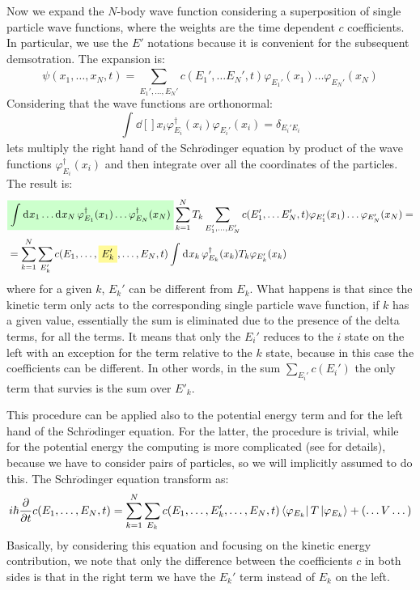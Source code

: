 \documentclass[../main/main.tex]{subfiles}
\begin{document}
Now we expand the \( N \)-body wave function considering a superposition of single particle wave functions, where the weights are the time dependent \( c \) coefficients. In particular, we use the \( E' \) notations because it is convenient for the subsequent demsotration.
The expansion is:
\begin{equation*}
  \psi (x_1, \dots, x_N, t) = \sum_{E_1', \dots, E_N'}^{} c(E_1', \dots E_N',t) \varphi _{E_1'} (x_1) \dots \varphi _{E_N'} (x_N)
\end{equation*}
Considering that the wave functions are orthonormal:
\begin{equation*}
  \int_{}^{} \dd[]{x_i} \varphi _{E_i}^\dag (x_i) \varphi _{E_i'} (x_i) = \delta _{E_i' E_i}
\end{equation*}
lets multiply the right hand of the Schr$\ddot{o}$dinger equation by  product of the wave functions \( \varphi _{E_i}^\dag (x_i)  \)  and then integrate over all the coordinates of the particles. The result is:  
\begin{equation*}
\begin{split}
  &\mathcolorbox{green!20}{\int_{}^{} \dd[]{x_1} \dots \dd[]{x_N} \varphi _{E_1}^\dag (x_1) \dots \varphi _{E_N}^\dag (x_N)}
  \sum_{k=1}^{N} T_k \sum_{E_1', \dots, E_N'}^{} c(E_1', \dots E_N',t) \varphi _{E_1'} (x_1) \dots \varphi _{E_N'} (x_N) = \\
  & = \sum_{k=1}^{N}  \sum_{E_k'}^{} c(E_1, \dots, \mathcolorbox{yellow!40}{E_k'}, \dots, E_N, t)  \int_{}^{} \dd[]{x_k} \varphi _{E_k}^\dag (x_k) T_k \varphi _{E_k'} (x_k)
\end{split}
\end{equation*}
where for a given \( k \), \( E_k' \) can be different from \( E_k \). What happens is that since the kinetic term only acts to the corresponding single particle wave function, if \( k \) has a given value, essentially the sum is eliminated due to the presence of the delta terms, for all the terms. It means that only the \( E_i' \) reduces to the \( i \) state on the left with an exception for the term relative to the \( k \) state, because in this case the coefficients can be different. In other words, in the sum \( \sum_{E_i'}^{} c(E_i')  \) the only term that survies is the sum over \( E'_k \).

This procedure can be applied also to the potential energy term and for the left hand of the Schr$\ddot{o}$dinger equation. For the latter, the procedure is trivial, while for the potential energy the computing is more complicated (see \cite{fetter} for details), because we have to consider pairs of particles, so we will implicitly assumed to do this. The Schr$\ddot{o}$dinger equation transform as:
\begin{equation}
   i \hbar \pdv{}{t} c (E_1, \dots, E_N, t) = \sum_{k=1}^{N} \sum_{E_k}^{} c(E_1, \dots,E_k', \dots,E_N, t)\bra{\varphi _{E_k}} T \ket{\varphi _{E_k}} + \qty(\dots V \dots)
\end{equation}
Basically, by considering this equation and focusing on the kinetic energy contribution, we note that only the difference between the coefficients \( c \) in both sides is that in the right term we have the \( E_{k}' \) term instead of \( E_k \) on the left.
\end{document}
